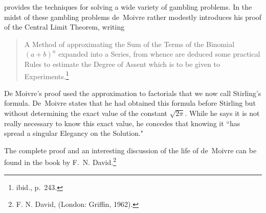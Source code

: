  provides the techniques for solving a wide
variety of gambling problems.  In the midst of these gambling problems
de~Moivre rather modestly introduces his proof of the Central Limit Theorem,
writing
\begin{quote}
A Method of approximating the Sum of the Terms of the Binomial $(a + b)^n$
expanded into a Series, from whence are deduced some practical Rules to
estimate the Degree of Assent which is to be given to
Experiments.\footnote{ibid., p.~243.}
\end{quote}
De Moivre's proof used the approximation to factorials that we now call
Stirling's formula.  De~Moivre states that he had obtained this formula before
Stirling but without determining the exact value of the constant
$\sqrt{2\pi}$.  While he says it is not really necessary to know this exact
value, he concedes that knowing it ``has spread a singular Elegancy on the
Solution."
\par
The complete proof and an interesting discussion of the life of 
de~Moivre can be found in the book  by F.~N.
David.\footnote{F. N. David,  (London:
Griffin, 1962).}

\pagebreak[4]

